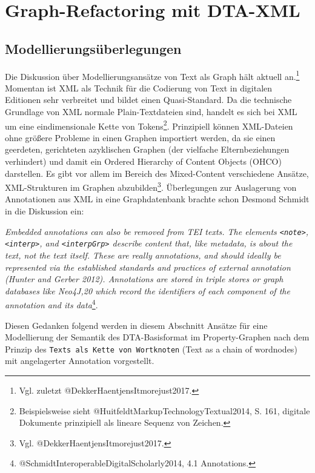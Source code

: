 \documentclass[ngerman,]{scrreprt}
\begin{document}
\chapter{Graph-Refactoring mit DTA-XML}\label{graph-refactoring-mit-dta-xml}

\section{Modellierungsüberlegungen}\label{modellierungsuxfcberlegungen}

Die Diskussion über Modellierungsansätze von Text als Graph hält aktuell an.\footnote{Vgl. zuletzt @DekkerHaentjensItmorejust2017.} Momentan ist XML als Technik für die Codierung von Text in digitalen Editionen sehr verbreitet und bildet einen Quasi-Standard. Da die technische Grundlage von XML normale Plain-Textdateien sind, handelt es sich bei XML um eine eindimensionale Kette von Tokens\footnote{Beispielsweise sieht @HuitfeldtMarkupTechnologyTextual2014, S. 161, digitale Dokumente prinzipiell als lineare Sequenz von Zeichen.}. Prinzipiell können XML-Dateien ohne größere Probleme in einen Graphen importiert werden, da sie einen geerdeten, gerichteten azyklischen Graphen (der vielfache Elternbeziehungen verhindert) und damit ein Ordered Hierarchy of Content Objects (OHCO) darstellen. Es gibt vor allem im Bereich des Mixed-Content verschiedene Ansätze, XML-Strukturen im Graphen abzubilden\footnote{Vgl. @DekkerHaentjensItmorejust2017.}. Überlegungen zur Auslagerung von Annotationen aus XML in eine Graphdatenbank brachte schon Desmond Schmidt in die Diskussion ein:

\emph{Embedded annotations can also be removed from TEI texts. The elements \texttt{\textless{}note\textgreater{}}, \texttt{\textless{}interp\textgreater{}}, and \texttt{\textless{}interpGrp\textgreater{}} describe content that, like metadata, is about the text, not the text itself. These are really annotations, and should ideally be represented via the established standards and practices of external annotation (Hunter and Gerber 2012). Annotations are stored in triple stores or graph databases like Neo4J,20 which record the identifiers of each component of the annotation and its data}\footnote{@SchmidtInteroperableDigitalScholarly2014, 4.1 Annotations.}.

Diesen Gedanken folgend werden in diesem Abschnitt Ansätze für eine Modellierung der Semantik des DTA-Basisformat im Property-Graphen nach dem Prinzip des \texttt{Texts\ als\ Kette\ von\ Wortknoten} (Text as a chain of wordnodes) mit angelagerter Annotation vorgestellt.
\end{document}
